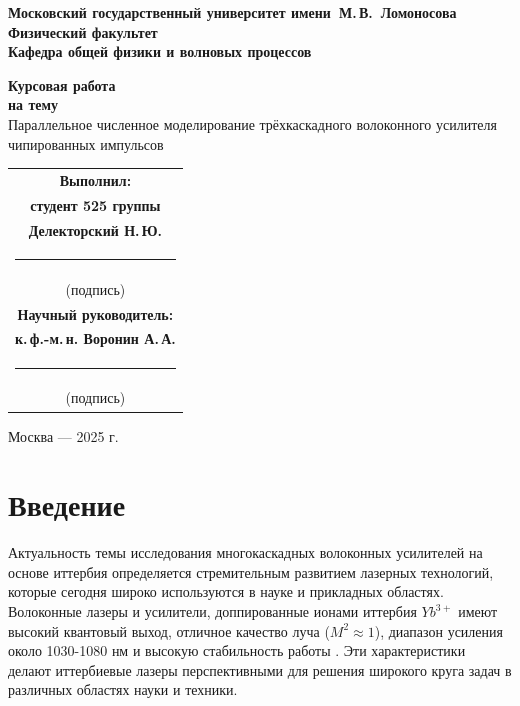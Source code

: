 \documentclass[12pt]{article}
\renewcommand{\headrulewidth}{0pt}
\renewcommand{\footrulewidth}{0pt}
\begin{document}
\textbf{}

\begin{titlepage}
  \centering

    \begin{spacing}{1}
      {\bfseries
        Московский государственный университет имени~М.\,В.~Ломоносова\\[1ex]
        Физический факультет\\[1ex]
        Кафедра общей физики и волновых процессов\\[3cm]
      }
    \end{spacing}

  \begin{spacing}{1}
      {\bfseries Курсовая работа}\\[0ex]
      {\bfseries на тему}\\[1ex]
      {Параллельное численное моделирование трёхкаскадного волоконного усилителя чипированных импульсов}\\[4cm]
  \end{spacing}

  \begin{tabular}{c}
    \bfseries Выполнил:\\
    \bfseries студент 525 группы\\
    {\bfseries Делекторский Н.\,Ю.}\\[1ex]
    \rule{6cm}{0.4pt}\\
    (подпись)\\[2em]

    \bfseries Научный руководитель:\\
    \bfseries к.\,ф.-м.\,н. Воронин А.\,А.\\[1ex]
    \rule{6cm}{0.4pt}\\
    (подпись)
  \end{tabular}

  \vfill

  Москва — 2025 г.

\end{titlepage}

\pagestyle{fancy}
\fancyhf{}
\fancyfoot[C]{\thepage}
\renewcommand{\headrulewidth}{0pt}
\renewcommand{\footrulewidth}{0pt}

\setcounter{page}{2}

\tableofcontents
\clearpage

\section{Введение}
Актуальность темы исследования многокаскадных волоконных усилителей на основе иттербия определяется стремительным
развитием лазерных технологий, которые сегодня широко используются в науке и прикладных областях. Волоконные лазеры и
усилители, доппированные ионами иттербия $Yb^{3+}$ имеют высокий квантовый выход, отличное качество луча ($M^2 \approx 1$),
диапазон усиления около 1030-1080 нм и высокую стабильность работы \cite{High_Power_Fiber_Lasers:_A_Review}. Эти
характеристики делают иттербиевые лазеры перспективными для решения широкого круга задач в различных областях науки
и техники.
\end{document}
